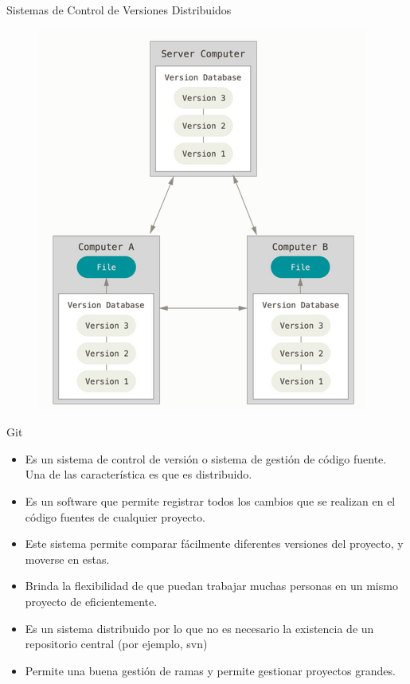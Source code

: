 \documentclass{beamer}
\begin{document}
\begin{frame}{Sistemas de Control de Versiones Distribuidos}
	\begin{figure}
		\centering
		\includegraphics[width=0.7\linewidth]{img/distribuido}
		\caption{}
		\label{fig:distribuido}
	\end{figure}
\end{frame}

\begin{frame}{Git}
	\begin{itemize}
		\item Es un sistema de control de versión o sistema de gestión de código fuente. Una de las característica es que es distribuido.
		\item Es un software que permite registrar todos los cambios que se realizan en el código fuentes de cualquier proyecto.
		\item Este sistema permite comparar fácilmente diferentes versiones del proyecto, y moverse en estas.
		\item Brinda la flexibilidad de que puedan trabajar muchas personas en un mismo proyecto de eficientemente.
		\item Es un sistema distribuido por lo que no es necesario la existencia de un repositorio central (por ejemplo, svn)
		\item Permite una buena gestión de ramas y permite gestionar proyectos grandes.
		
	\end{itemize}
\end{frame}
\end{document}
